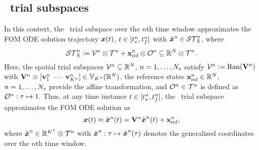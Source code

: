 \subsection{\spatialAcronym\ trial subspaces}
In this context, the \spatialAcronym\ trial subspace over the $n$th time window approximates
the FOM ODE solution trajectory ${\boldsymbol x}(t)$,
$t\in[t_s^{n},t_f^{n}]$ 
with $\tilde{\boldsymbol x}^{n} \in \mathcal{ ST }_{\text{S}}^{n}$, where
\begin{equation}\label{eq:sttrialspace}
 \mathcal{ ST }_{\text{S}}^{n} \vcentcolon= 
	\mathcal{V }^{n} \otimes \mathcal{T}^{n} +
	\mathbf{x}_\text{ref}^{n}\otimes\mathcal{O}^n\subseteq\mathbb{R}^{N} \otimes \mathcal{T}^{n}.
\end{equation}
Here, the spatial trial subspaces $\mathcal{V }^{n}\subseteq\mathbb{R}^{N}$,
$n=1,\ldots,N_s$ satisfy 
$\mathcal{V }^{n}\vcentcolon=\mathrm{Ran}(\mathbf {V}^{n})$ with 
$\basismatArg{n}\equiv[\basisvecArg{n}_1\ \cdots\
\basisvecArg{n}_{\romdimArg{n}}]\in
\RRStar{\romdimArg{n}}{\fomdim}
$, the reference states $\mathbf{x}_\text{ref}^{n} \in \mathbb{R}^{N}$, $n=1,\ldots,N_s$ provide the affine transformation, 
and  
$\mathcal{O}^n\in\mathcal{T}^{n}$ is defined as
$\mathcal{O}^n:\tau\mapsto 1.$
Thus, at any time instance $t\in[t_s^{n},t_f^{n}]$, the
\spatialAcronym\ trial subspace 
approximates the FOM ODE solution as
\begin{equation}\label{eq:affine_trialspace_tclsrm}
	{\boldsymbol x}(t)\approx \tilde{\boldsymbol x}^{n}(t) = \mathbf {V}^{n}
	\hat{ \boldsymbol x}^{n}(t) + \mathbf{x}_\text{ref}^{n},
\end{equation}
where $\hat{ \boldsymbol x}^{n} \in \mathbb{R}^{K^{n}} \otimes \mathcal{T}^{n}$ with
$\hat{ \boldsymbol x}^{n}: \tau\mapsto \hat{ \boldsymbol x}^{n}(\tau)
$ denotes the generalized coordinates over the $n$th time window. 

